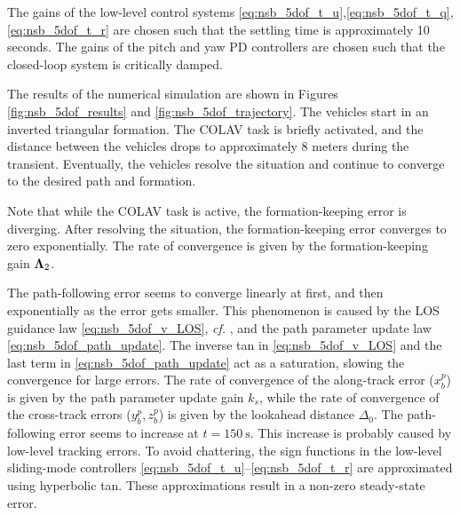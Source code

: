 The gains of the low-level control systems \eqref{eq:nsb_5dof_t_u},\eqref{eq:nsb_5dof_t_q},\eqref{eq:nsb_5dof_t_r} are chosen such that the settling time is approximately 10 seconds.
The gains of the pitch and yaw PD controllers are chosen such that the closed-loop system is critically damped.

The results of the numerical simulation are shown in Figures \ref{fig:nsb_5dof_results} and \ref{fig:nsb_5dof_trajectory}.
The vehicles start in an inverted triangular formation.
The COLAV task is briefly activated, and the distance between the vehicles drops to approximately 8 meters during the transient.
Eventually, the vehicles resolve the situation and continue to converge to the desired path and formation.

Note that while the COLAV task is active, the formation-keeping error is diverging.
After resolving the situation, the formation-keeping error converges to zero exponentially.
The rate of convergence is given by the formation-keeping gain $\bm{\Lambda}_2$.

The path-following error seems to converge linearly at first, and then exponentially as the error gets smaller.
This phenomenon is caused by the LOS guidance law \eqref{eq:nsb_5dof_v_LOS}, \emph{cf.} \cite{fossen_uniform_2014}, and the path parameter update law \eqref{eq:nsb_5dof_path_update}.
The inverse tan in \eqref{eq:nsb_5dof_v_LOS} and the last term in \eqref{eq:nsb_5dof_path_update} act as a saturation, slowing the convergence for large errors.
The rate of convergence of the along-track error ($x_b^p$) is given by the path parameter update gain $k_{s}$, while the rate of convergence of the cross-track errors ($y_b^p, z_b^p$) is given by the lookahead distance $\Delta_0$.
The path-following error seems to increase at $t = \SI{150}{\second}$.
This increase is probably caused by low-level tracking errors.
To avoid chattering, the sign functions in the low-level sliding-mode controllers \eqref{eq:nsb_5dof_t_u}--\eqref{eq:nsb_5dof_t_r} are approximated using hyperbolic tan.
These approximations result in a non-zero steady-state error.

